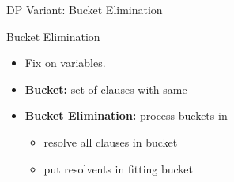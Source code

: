 \documentclass[t]{sdqbeamer}
\begin{document}
\begin{frame}{DP Variant: Bucket Elimination}
\begin{block}{Bucket Elimination}
\begin{itemize}\setlength{\itemsep}{1em}
\item Fix  on variables.
\item \textbf{Bucket:} set of clauses with same  
\item \textbf{Bucket Elimination:} process buckets in 
\begin{itemize}\setlength{\itemsep}{1ex}
	\item resolve all clauses in bucket
	\item put resolvents in fitting bucket
\end{itemize}
\end{itemize}
\end{block}
\end{frame}
\end{document}
